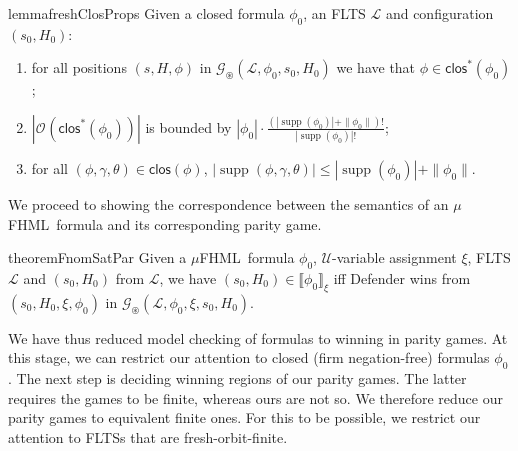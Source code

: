 \documentclass[10pt,a4paper]{article}
\theoremstyle{definition}
\theoremstyle{remark}
\newcommand\fhml[0]{$\mu$FHML}
\DeclareMathOperator{\supp}{supp}
\newcommand\sem[2][\xi]{\llbracket#2\rrbracket_{#1}}
\newcommand\Gcal{\mathcal{G}}
\newcommand\Lcal{\mathcal{L}}
\newcommand\Ucal{\mathcal{U}}
\newcommand\orb[1][]{\mathcal{O}_{#1}}
\newcommand{\clos}[0]{\mathsf{clos}}
\newcommand\fgame[0]{\Gcal_\circledast}
\begin{document}
\begin{restatable}{lemma}{freshClosProps}\label{lem:freshClosProps}
Given a closed formula $\phi_0$, an FLTS $\Lcal$ and configuration $(s_0,H_0)$:
    \begin{enumerate}
                \item\label{lem:freshClosProps:2} for all positions $(s,H,\phi)$ in $\fgame(\Lcal,\phi_0, s_0,H_0)$ we have that $\phi\in\clos^*(\phi_0)$; 
        \item\label{lem:freshClosProps:3} $|\orb(\clos^*(\phi_0))|$ is bounded by $|\phi_0|\cdot \frac{(|\supp(\phi_0)| + \|\phi_0\|)!}{|\supp(\phi_0)|!}$;
\item\label{lem:freshClosProps:4} for all $(\phi,\gamma,\theta)\in\clos(\phi)$, $|\supp(\phi,\gamma,\theta)| \le |\supp(\phi_0)| + \|\phi_0\|$. 
    \end{enumerate}
\end{restatable}




We proceed to showing the correspondence between the semantics of an \fhml\ formula and its corresponding parity game.
\begin{restatable}{theorem}{FnomSatPar}\label{thm:FnomSatPar}     Given a \fhml\ formula $\phi_0$,
    $\Ucal$-variable assignment $\xi$,
    FLTS $\Lcal$ and $(s_0, H_0)$ from $\Lcal$, we have $(s_0, H_0) \in \sem{\phi_0}$ iff Defender wins from $(s_0, H_0,\xi, \phi_0)$ in $\fgame(\Lcal, \phi_0, \xi, s_0,H_0)$.
\end{restatable}

We have thus reduced model checking of formulas to winning in parity games. 
At this stage, we can restrict our attention to closed (firm negation-free) formulas $\phi_0$.
The next step is deciding
winning regions of our parity games. The latter requires the games to be finite, whereas ours are not so. We therefore reduce our parity games to equivalent finite ones.
For this to be possible, we restrict our attention to FLTSs that are fresh-orbit-finite.
\end{document}

